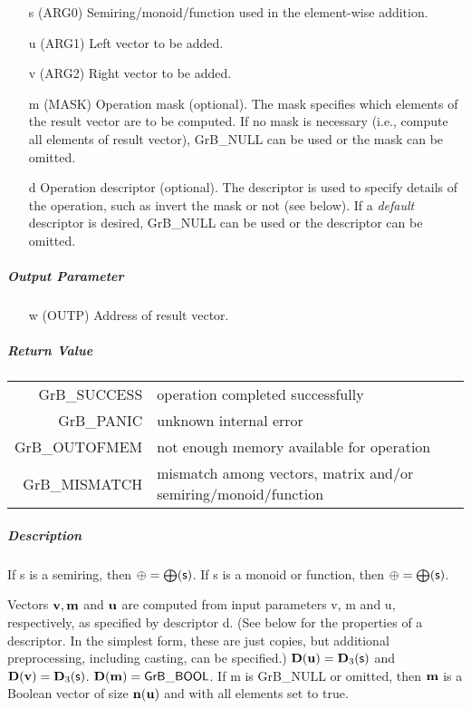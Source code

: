 \begin{itemize}
	\item[{\sf s}] ({\sf ARG0}) Semiring/monoid/function used in the element-wise addition.

	\item[{\sf u}] ({\sf ARG1}) Left vector to be added.

	\item[{\sf v}] ({\sf ARG2}) Right vector to be added.

	\item[{\sf m}] ({\sf MASK}) Operation mask (optional). The mask
	specifies which elements of the result vector are to be computed.
	If no mask is necessary (i.e., compute all elements of result
	vector), {\sf GrB\_NULL} can be used or the mask can be omitted.

	\item[{\sf d}] Operation descriptor (optional). The descriptor
	is used to specify details of the operation, such as 
	invert the mask or not (see below). If a
	\emph{default} descriptor is desired, {\sf GrB\_NULL} can be
	used or the descriptor can be omitted.
\end{itemize}

\subparagraph{Output Parameter}

\begin{itemize}
	\item[{\sf w}] ({\sf OUTP}) Address of result vector.
\end{itemize}

\subparagraph{Return Value}

\begin{tabular}{rl} 
{\sf GrB\_SUCCESS} 	& operation completed successfully \\
{\sf GrB\_PANIC}	& unknown internal error \\
{\sf GrB\_OUTOFMEM}	& not enough memory available for operation \\
{\sf GrB\_MISMATCH}	& mismatch among vectors, matrix and/or semiring/monoid/function
\end{tabular}

\subparagraph{Description}

If {\sf s} is a semiring, then $\oplus = \bigoplus({\sf s})$. 
If {\sf s} is a monoid or function, then $\oplus = \bigoplus({\sf s})$.

Vectors ${\bf v}, {\bf m}$ and ${\bf u}$ are computed from
input parameters {\sf v}, {\sf m} and {\sf u}, respectively, as specified
by descriptor {\sf d}. (See below for the properties of a descriptor. In
the simplest form, these are just copies, but additional preprocessing,
including casting, can be specified.)  $\bold{D}({\bf u}) =
\bold{D}_3({\sf s})$ and $\bold{D}({\bf v}) = \bold{D}_3({\sf s})$.
$\bold{D}({\bf m}) = {\sf GrB\_BOOL}$.  If {\sf m} is {\sf GrB\_NULL} or omitted,
then ${\bf m}$ is a Boolean vector of size $\bold{n}({\bf u})$
and with all elements set to {\sf true}.

